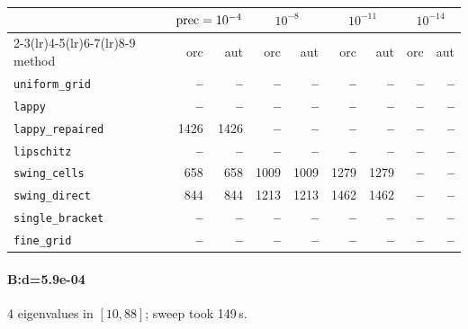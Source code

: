 \begin{center}
\small
\begin{tabular}{lrrrrrrrr}
\toprule
& \multicolumn{2}{c}{$\mathrm{prec}=10^{-4}$} & \multicolumn{2}{c}{$10^{-8}$} & \multicolumn{2}{c}{$10^{-11}$} & \multicolumn{2}{c}{$10^{-14}$} \\
\cmidrule(lr){2-3}\cmidrule(lr){4-5}\cmidrule(lr){6-7}\cmidrule(lr){8-9}
method & orc & aut & orc & aut & orc & aut & orc & aut \\
\midrule
\texttt{uniform\_grid} & \textbf{--} & \textbf{--} & \textbf{--} & \textbf{--} & \textbf{--} & \textbf{--} & \textbf{--} & \textbf{--} \\
\texttt{lappy} & \textbf{--} & \textbf{--} & \textbf{--} & \textbf{--} & \textbf{--} & \textbf{--} & \textbf{--} & \textbf{--} \\
\texttt{lappy\_repaired} & 1426 & 1426 & \textbf{--} & \textbf{--} & \textbf{--} & \textbf{--} & \textbf{--} & \textbf{--} \\
\texttt{lipschitz} & \textbf{--} & \textbf{--} & \textbf{--} & \textbf{--} & \textbf{--} & \textbf{--} & \textbf{--} & \textbf{--} \\
\texttt{swing\_cells} & 658 & 658 & 1009 & 1009 & 1279 & 1279 & \textbf{--} & \textbf{--} \\
\texttt{swing\_direct} & 844 & 844 & 1213 & 1213 & 1462 & 1462 & \textbf{--} & \textbf{--} \\
\midrule
\texttt{single\_bracket} & \textbf{--} & \textbf{--} & \textbf{--} & \textbf{--} & \textbf{--} & \textbf{--} & \textbf{--} & \textbf{--} \\
\texttt{fine\_grid} & \textbf{--} & \textbf{--} & \textbf{--} & \textbf{--} & \textbf{--} & \textbf{--} & \textbf{--} & \textbf{--} \\
\bottomrule
\end{tabular}
\end{center}

\paragraph{B:d=5.9e-04} 4 eigenvalues in $[10, 88]$; sweep took 149\,s.

